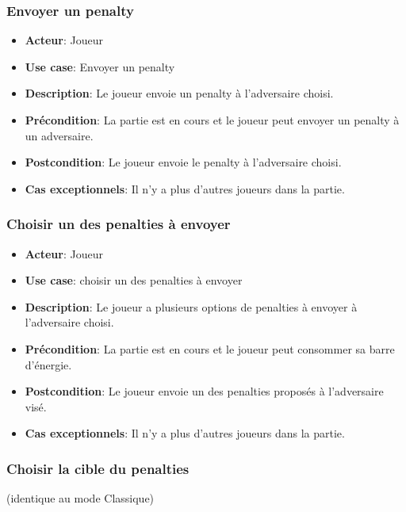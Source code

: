 \documentclass{article}
\begin{document}
\subsubsection*{Envoyer un penalty}
\begin{itemize}
    \item \textbf{Acteur}: Joueur
    \item \textbf{Use case}: Envoyer un penalty
    \item \textbf{Description}: Le joueur envoie un penalty à l'adversaire choisi.
    \item \textbf{Précondition}: La partie est en cours et le joueur peut envoyer un penalty à un adversaire.
    \item \textbf{Postcondition}: Le joueur envoie le penalty à l'adversaire choisi.
    \item \textbf{Cas exceptionnels}: Il n'y a plus d'autres joueurs dans la partie. 
\end{itemize}

\subsubsection*{Choisir un des penalties à envoyer}
\begin{itemize}
    \item \textbf{Acteur}: Joueur
    \item \textbf{Use case}: choisir un des penalties à envoyer
    \item \textbf{Description}: Le joueur a plusieurs options de penalties à envoyer à l'adversaire choisi.
    \item \textbf{Précondition}: La partie est en cours et le joueur peut consommer sa barre d'énergie.
    \item \textbf{Postcondition}: Le joueur envoie un des penalties proposés à l'adversaire visé.
    \item \textbf{Cas exceptionnels}: Il n'y a plus d'autres joueurs dans la partie.
\end{itemize}

\subsubsection*{Choisir la cible du penalties} (identique au mode Classique)


\end{document}
